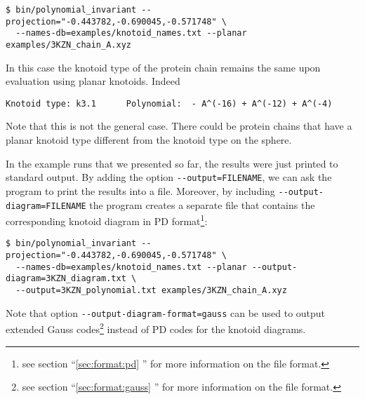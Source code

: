 \begin{lstlisting}
$ bin/polynomial_invariant --projection="-0.443782,-0.690045,-0.571748" \
  --names-db=examples/knotoid_names.txt --planar examples/3KZN_chain_A.xyz
\end{lstlisting}
In this case the knotoid type of the protein chain remains the same upon evaluation using planar knotoids. Indeed
\begin{lstlisting}
Knotoid type: k3.1      Polynomial:  - A^(-16) + A^(-12) + A^(-4)
\end{lstlisting}
Note that this is not the general case. There could be protein chains that have a planar knotoid type different from the knotoid type on the sphere.

In the example runs that we presented so far, the results were just printed to standard output. By adding the option \lstinline{--output=FILENAME}, we can ask the program to print the results into a file. Moreover, by including \lstinline{--output-diagram=FILENAME} the program creates a separate file that contains the corresponding knotoid diagram in PD format\footnote{see section ``\ref{sec:format:pd} '' for more information on the file format.}:
\begin{lstlisting}
$ bin/polynomial_invariant --projection="-0.443782,-0.690045,-0.571748" \
  --names-db=examples/knotoid_names.txt --planar --output-diagram=3KZN_diagram.txt \ 
  --output=3KZN_polynomial.txt examples/3KZN_chain_A.xyz
\end{lstlisting}
Note that option \lstinline{--output-diagram-format=gauss} can be used to output extended Gauss codes\footnote{see section ``\ref{sec:format:gauss} '' for more information on the file format.} instead of PD codes for the knotoid diagrams.

